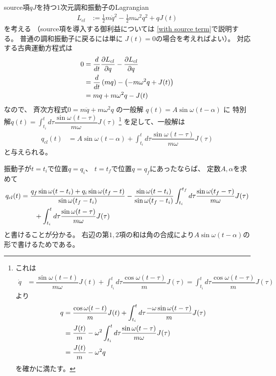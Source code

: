 source項$qJ$を持つ$1$次元調和振動子のLagrangian
\begin{align}
    L_{cl}
    &:=
    \frac{1}{2}m\dot{q}^2
    -
    \frac{1}{2}m\omega^2q^2
    +
    qJ(t)
\end{align}
を考える
（source項を導入する御利益については
\ref{with source term}で説明する。
普通の調和振動子に戻るには単に
$J(t) = 0$の場合を考えればよい）。
対応する古典運動方程式は
\begin{align}
    0
    &=
    \frac{d}{dt}
    \frac{\partial L_{cl}}{\partial \dot{q}}
    -
    \frac{\partial L_{cl}}{\partial q}
\notag\\&=
    \frac{d}{dt}
    \left(
        m\dot{q}
    \right)
    -
    \left(
        -
        m\omega^2q
        +
        J(t)
    \right)
\notag\\&=
    m\ddot{q}
    +
    m\omega^2q
    -
    J(t)
\end{align}
なので、
斉次方程式$0 = m \ddot{q} + m \omega^2 q$
の一般解
$q(t) = A \sin \omega (t - \alpha)$
に
特別解$
    q(t) = \int_{t_i}^t
    d\tau
    \dfrac{ \sin \omega (t-\tau) }{
        m \omega
    }
    J(\tau)
$
\footnote{
    これは
    \begin{align}
        \dot{q}
    &=
        \dfrac{ \sin \omega (t-t) }{ m \omega }
        J(t)
        +
        \int_{t_i}^t d\tau
            \dfrac{ \cos \omega (t-\tau) }{ m }
            J(\tau)
    =
        \int_{t_i}^t d\tau
            \dfrac{ \cos \omega (t-\tau) }{ m }
            J(\tau)
    \label{time derivative of classical solution of harm osci with source}
    \end{align}
    より
    \begin{align}
        \ddot{q}
        &=
        \dfrac{ \cos \omega (t-t) }{ m }
        J(t)
        +
        \int_{t_i}^t d\tau
        \dfrac{ - \omega \sin \omega (t-\tau) }{m}
        J(\tau)
    \notag\\&=
        \dfrac{J(t)}{m}
        -
        \omega^2\int_{t_i}^t d\tau
        \dfrac{ \sin \omega (t-\tau) }{m \omega}
        J(\tau)
    \notag\\&=
        \dfrac{ J(t) }{m}
        -
        \omega^2 q
    \end{align}
    を確かに満たす。
}
を足して、一般解は
\begin{align}
    q_{cl}(t)
    &=
    A \sin \omega (t-\alpha)
    +
    \int_{t_i}^t d\tau
    \dfrac{ \sin \omega (t-\tau) }{m\omega}
    J(\tau)
\end{align}
と与えられる。

振動子が$t=t_i$で位置$q=q_i$、
$t=t_f$で位置$q=q_f$にあったならば、
定数$A, \alpha$を求めて
\begin{align}
    q_{cl}(t)
    &=
    \frac{
        q_f \sin \omega (t - t_i)
        +
        q_i \sin \omega (t_f - t)
    }{ \sin \omega (t_f - t_i) }
    -
    \frac{ \sin \omega (t - t_i) }{
        \sin \omega(t_f - t_i)
    }
    \int_{t_i}^{t_f} d\tau
    \frac{ \sin \omega (t_f-\tau) }{m\omega}
    J(\tau)
\notag\\&\qquad
    +
    \int_{t_i}^t d\tau
    \frac{ \sin \omega (t-\tau)}{m\omega}
    J(\tau)
\end{align}
と書けることが分かる。
右辺の第$1, 2$項の和は角の合成により$A\sin\omega (t-\alpha)$の形で書けるためである。

